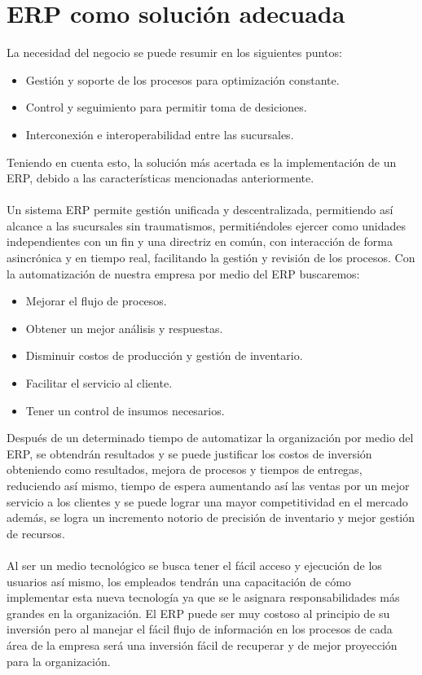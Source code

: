 \section{ERP como soluci\'on adecuada}
%
La necesidad del negocio se puede resumir en los siguientes puntos:%
%
\begin{itemize}
\item Gesti\'on y soporte de los procesos para optimizaci\'on constante.
\item Control y seguimiento para permitir toma de desiciones.
\item Interconexi\'on e interoperabilidad entre las sucursales.
\end{itemize}
%
Teniendo en cuenta esto, la soluci\'on m\'as acertada es la implementaci\'on de un ERP, debido a las caracter\'isticas mencionadas anteriormente.%
\\%
\\%
Un sistema ERP permite gesti\'on unificada y descentralizada, permitiendo as\'i alcance a las sucursales sin traumatismos, permiti\'endoles ejercer como unidades independientes con un fin y una directriz en com\'un, con interacci\'on de forma asincr\'onica y en tiempo real, facilitando la gesti\'on y revisi\'on de los procesos.%
Con la automatizaci\'on de nuestra empresa por medio del ERP buscaremos:
%
\begin{itemize}
	\item Mejorar el flujo de procesos. 
	\item Obtener un mejor an\'alisis y respuestas.
	\item Disminuir costos de producci\'on y gesti\'on de inventario.
	\item Facilitar el servicio al cliente.
	\item Tener un control de insumos necesarios.
\end{itemize}
%
Despu\'es de un determinado tiempo de automatizar la organizaci\'on por medio del ERP, se obtendr\'an resultados y se puede justificar los costos de inversi\'on obteniendo como resultados, mejora de procesos y tiempos de entregas, reduciendo as\'i mismo, tiempo de espera  aumentando as\'i las ventas por un mejor servicio a los clientes y se puede lograr una mayor competitividad  en el mercado adem\'as, se logra un incremento notorio de precisi\'on de inventario y mejor gesti\'on de recursos.%
\\%
\\%
Al ser un medio tecnol\'ogico se busca tener el f\'acil acceso y ejecuci\'on de los usuarios as\'i mismo, los empleados tendr\'an una capacitaci\'on de c\'omo implementar esta nueva tecnolog\'ia ya que se le asignara responsabilidades m\'as grandes en la organizaci\'on. El ERP puede ser muy costoso al principio de su inversi\'on pero al manejar el f\'acil flujo de informaci\'on en los procesos de cada \'area de la empresa ser\'a una inversi\'on f\'acil de recuperar y de mejor proyecci\'on para la organizaci\'on.%
